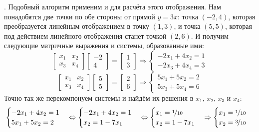 \documentclass[a3paper,14pt]{extarticle}
\begin{document}
. Подобный алгоритм применим и для расчёта этого отображения. Нам понадобятся две точки по обе стороны от прямой $y=3x$: точка $(-2, 4)$, которая преобразуется линейным отображением в точку $(1, 3)$, и точка $(5, 5)$, которая под действием линейного отображения станет точкой $(2, 6)$. И получим следующие матричные выражения и системы, образованные ими:
$$\begin{bmatrix}
    x_1 & x_2 \\ x_3 & x_4
\end{bmatrix}\begin{bmatrix}
    -2 \\ 4
\end{bmatrix} = \begin{bmatrix}
    1 \\ 3
\end{bmatrix} \Rightarrow \begin{cases}
    -2x_1+4x_2 = 1 \\ -2x_3+4x_4 = 3
\end{cases}$$$$\begin{bmatrix}
    x_1 & x_2 \\ x_3 & x_4
\end{bmatrix}\begin{bmatrix}
    5 \\ 5
\end{bmatrix} = \begin{bmatrix}
    2 \\ 6
\end{bmatrix} \Rightarrow \begin{cases}
    5x_1+5x_2 = 2 \\ 5x_3+5x_4 = 6
\end{cases}$$
Точно так же перекомпонуем системы и найдём их решения в $x_1$, $x_2$, $x_3$ и $x_4$:
$$\begin{cases}
    -2x_1+4x_2 = 1 \\ 5x_1+5x_2 = 2
\end{cases} \Leftrightarrow \begin{cases}
    -2x_1+4x_2 = 1 \\ x_2 = 1-7x_1
\end{cases} \Leftrightarrow \begin{cases}
    x_1 = \nicefrac{1}{10} \\ x_2 = 1-7x_1
\end{cases} \Rightarrow \begin{cases}
    x_1 = \nicefrac{1}{10} \\ x_2 = \nicefrac{3}{10}
\end{cases}$$
\end{document}
